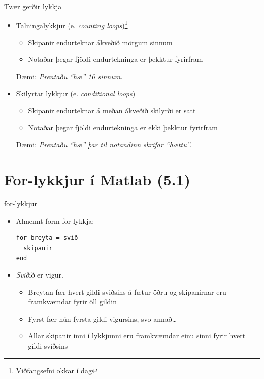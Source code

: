 \documentclass{beamer}
\begin{document}
\begin{frame}{Tvær gerðir lykkja}
\begin{itemize}
 \item Talningalykkjur (e. \emph{counting loops})\footnote{Viðfangsefni okkar í dag}
 \begin{itemize}
  \item Skipanir endurteknar ákveðið mörgum sinnum
  \item Notaðar þegar fjöldi endurtekninga er þekktur fyrirfram
 \end{itemize}
 Dæmi: \emph{Prentaðu ``hæ'' 10 sinnum.}
 \pause
 \item Skilyrtar lykkjur (e. \emph{conditional loops})
 \begin{itemize}
  \item Skipanir endurteknar á meðan ákveðið skilyrði er satt
  \item Notaðar þegar fjöldi endurtekninga er ekki þekktur fyrirfram
 \end{itemize}
 Dæmi: \emph{Prentaðu ``hæ'' þar til notandinn skrifar ``hættu''.}
\end{itemize}
\end{frame}

\section{For-lykkjur í Matlab (5.1)}

\begin{frame}[fragile]{for-lykkjur}
\begin{itemize}
 \item Almennt form for-lykkja:
\begin{verbatim}
for breyta = svið
  skipanir
end
\end{verbatim}
 \item \emph{Svið}ið er vigur. 
 \begin{itemize}
  \item Breytan fær hvert gildi sviðsins á fætur öðru og skipanirnar eru framkvæmdar fyrir öll gildin
  \item Fyrst fær hún fyrsta gildi vigursins, svo annað\ldots
  \item Allar skipanir inni í lykkjunni eru framkvæmdar einu sinni fyrir hvert gildi sviðsins
 \end{itemize}
\end{itemize}
\end{frame}
\end{document}
